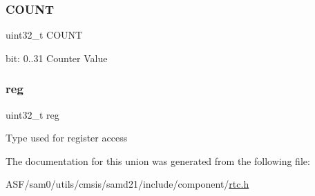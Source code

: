 \subsubsection{\texorpdfstring{COUNT}{COUNT}}
{\footnotesize\ttfamily uint32\+\_\+t C\+O\+U\+NT}

bit\+: 0..31 Counter Value \mbox{\label{union_r_t_c___m_o_d_e0___c_o_u_n_t___type_a6b91636401516a477989a336376d7b40}} 
\subsubsection{\texorpdfstring{reg}{reg}}
{\footnotesize\ttfamily uint32\+\_\+t reg}

Type used for register access 

The documentation for this union was generated from the following file\+:\begin{DoxyCompactItemize}
\item 
A\+S\+F/sam0/utils/cmsis/samd21/include/component/\mbox{\hyperlink{component_2rtc_8h}{rtc.\+h}}\end{DoxyCompactItemize}
